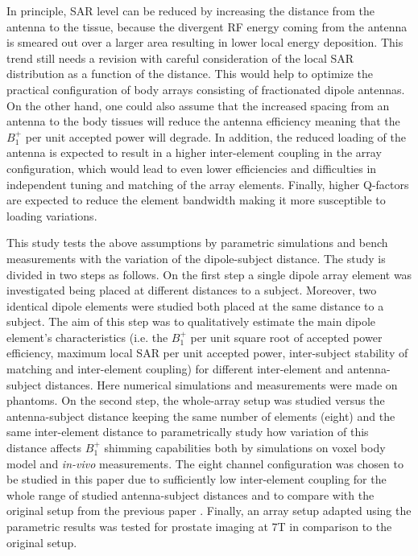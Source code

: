 \documentclass[fleqn,10pt]{wlscirep}
\begin{document}
In principle, SAR level can be reduced by increasing the distance from the antenna to the tissue, because the divergent RF energy coming from the antenna is smeared out over a larger area resulting in lower local energy deposition. This trend still needs a revision with careful consideration of the local SAR distribution as a function of the distance. This would help to optimize the practical configuration of body arrays consisting of fractionated dipole antennas.
On the other hand, one could also assume that the increased spacing from an antenna to the body tissues will reduce the antenna efficiency meaning that the $B_1^{+}$ per unit accepted power will degrade. 
In addition, the reduced loading of the antenna is expected to result in a higher inter-element coupling in the array configuration, which would lead to even lower efficiencies and difficulties in independent tuning and matching of the array elements. Finally, higher Q-factors are expected to reduce the element bandwidth making it more susceptible to loading variations.

This study tests the above assumptions by parametric simulations and bench measurements with the variation of the dipole-subject distance. The study is divided in two steps as follows. On the first step a single dipole array element was investigated being placed at different distances to a subject. Moreover, two identical dipole elements were studied both placed at the same distance to a subject. The aim of this step was to qualitatively estimate the main dipole element's characteristics (i.e. the $B_1^{+}$ per unit square root of accepted power efficiency, maximum local SAR per unit accepted power, inter-subject stability of matching and inter-element coupling) for different inter-element and antenna-subject distances. Here numerical simulations and measurements were made on phantoms.
On the second step, the whole-array setup was studied versus the antenna-subject distance keeping the same number of elements (eight) and the same inter-element distance to parametrically study how variation of this distance affects $B_1^{+}$ shimming capabilities both by simulations on voxel body model and \textit{in-vivo} measurements. The eight channel configuration was chosen to be studied in this paper due to sufficiently low inter-element coupling for the whole range of studied antenna-subject distances and to compare with the original setup from the previous paper \cite{Fractionated}. Finally, an array setup adapted using the parametric results was tested for prostate imaging at 7T in comparison to the original setup. 
\end{document}
